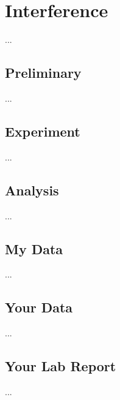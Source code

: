\chapter{Interference}
...
\section{Preliminary}
...
\section{Experiment}
...
\section{Analysis}
...
\section{My Data}
...
\section{Your Data}
...
\section{Your Lab Report}
...